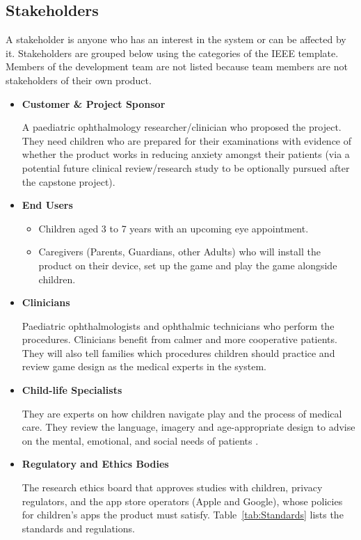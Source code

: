\documentclass[10pt]{article}
\begin{document}
\subsection{Stakeholders}\label{sec_Stakeholders}
A stakeholder is anyone who has an interest in the system or can be affected by it. 
Stakeholders are grouped below using the categories of the IEEE template. Members of the 
development team are not listed because team members are not stakeholders of their own product.
\begin{itemize}
\item \textbf{Customer \& Project Sponsor}

A paediatric ophthalmology researcher/clinician who proposed 
the project. They need children who are prepared for their examinations with evidence of whether 
the product works in reducing anxiety amongst their patients (via a potential future clinical 
review/research study to be optionally pursued after the capstone project).

\item \textbf{End Users}
\begin{itemize}
    \item Children aged 3 to 7 years with an upcoming eye appointment.
    \item Caregivers (Parents, Guardians, other Adults) who will install the product on their device, set 
    up the game and play the game alongside children.
\end{itemize}

\item \textbf{Clinicians}

Paediatric ophthalmologists and ophthalmic technicians who perform the procedures. Clinicians benefit from calmer and more cooperative patients. They will also tell families which procedures children should 
practice and review game design as the medical experts in the system.

\item \textbf{Child-life Specialists}

They are experts on how children navigate play and the process of medical care. 
They review the language, imagery and age-appropriate design to advise on the mental, emotional, and social 
needs of patients \cite{mayoChildLifeSpecialist}.

\item \textbf{Regulatory and Ethics Bodies}

The research ethics board that approves studies with children, privacy regulators, and the app store operators 
(Apple and Google), whose policies for children's apps the product must satisfy.
Table~\ref{tab:Standards} lists the standards and regulations.


\end{itemize}
\end{document}
